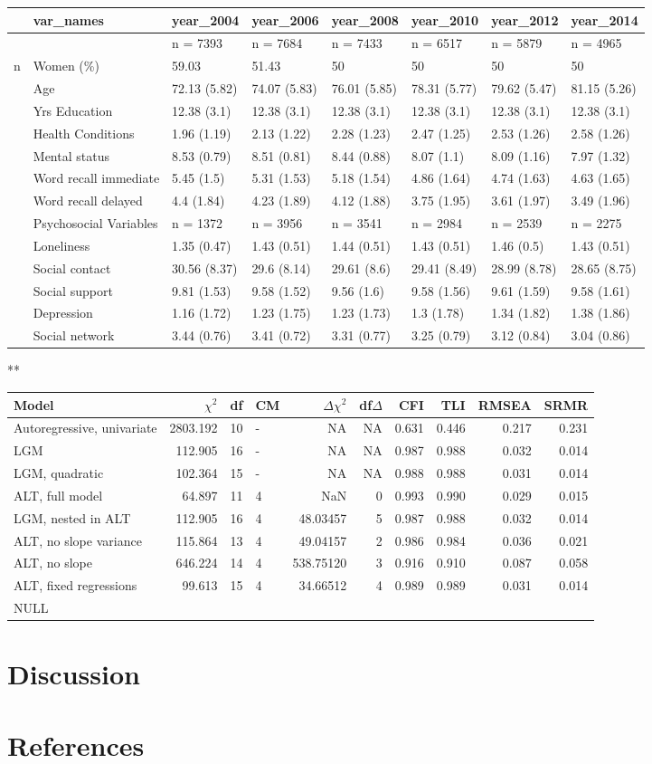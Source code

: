 \documentclass[english,man]{apa6}
\theoremstyle{definition}
\theoremstyle{definition}
\theoremstyle{remark}
\begin{document}
\begin{longtable}[]{@{}llllllll@{}}
\toprule
& var\_names & year\_2004 & year\_2006 & year\_2008 & year\_2010 &
year\_2012 & year\_2014\tabularnewline
\midrule
\endhead
& & n = 7393 & n = 7684 & n = 7433 & n = 6517 & n = 5879 & n =
4965\tabularnewline
n & Women (\%) & 59.03 & 51.43 & 50 & 50 & 50 & 50\tabularnewline
& Age & 72.13 (5.82) & 74.07 (5.83) & 76.01 (5.85) & 78.31 (5.77) &
79.62 (5.47) & 81.15 (5.26)\tabularnewline
& Yrs Education & 12.38 (3.1) & 12.38 (3.1) & 12.38 (3.1) & 12.38 (3.1)
& 12.38 (3.1) & 12.38 (3.1)\tabularnewline
& Health Conditions & 1.96 (1.19) & 2.13 (1.22) & 2.28 (1.23) & 2.47
(1.25) & 2.53 (1.26) & 2.58 (1.26)\tabularnewline
& Mental status & 8.53 (0.79) & 8.51 (0.81) & 8.44 (0.88) & 8.07 (1.1) &
8.09 (1.16) & 7.97 (1.32)\tabularnewline
& Word recall immediate & 5.45 (1.5) & 5.31 (1.53) & 5.18 (1.54) & 4.86
(1.64) & 4.74 (1.63) & 4.63 (1.65)\tabularnewline
& Word recall delayed & 4.4 (1.84) & 4.23 (1.89) & 4.12 (1.88) & 3.75
(1.95) & 3.61 (1.97) & 3.49 (1.96)\tabularnewline
& Psychosocial Variables & n = 1372 & n = 3956 & n = 3541 & n = 2984 & n
= 2539 & n = 2275\tabularnewline
& Loneliness & 1.35 (0.47) & 1.43 (0.51) & 1.44 (0.51) & 1.43 (0.51) &
1.46 (0.5) & 1.43 (0.51)\tabularnewline
& Social contact & 30.56 (8.37) & 29.6 (8.14) & 29.61 (8.6) & 29.41
(8.49) & 28.99 (8.78) & 28.65 (8.75)\tabularnewline
& Social support & 9.81 (1.53) & 9.58 (1.52) & 9.56 (1.6) & 9.58 (1.56)
& 9.61 (1.59) & 9.58 (1.61)\tabularnewline
& Depression & 1.16 (1.72) & 1.23 (1.75) & 1.23 (1.73) & 1.3 (1.78) &
1.34 (1.82) & 1.38 (1.86)\tabularnewline
& Social network & 3.44 (0.76) & 3.41 (0.72) & 3.31 (0.77) & 3.25 (0.79)
& 3.12 (0.84) & 3.04 (0.86)\tabularnewline
\bottomrule
\end{longtable}

\label{tab:immediate-word-recall-model-summaries}**

\begin{longtable}[]{@{}lrrlrrrrrr@{}}
\toprule
Model & \(\chi^2\) & df & CM & \(\Delta\chi^2\) & df\(\Delta\) & CFI &
TLI & RMSEA & SRMR\tabularnewline
\midrule
\endhead
Autoregressive, univariate & 2803.192 & 10 & - & NA & NA & 0.631 & 0.446
& 0.217 & 0.231\tabularnewline
LGM & 112.905 & 16 & - & NA & NA & 0.987 & 0.988 & 0.032 &
0.014\tabularnewline
LGM, quadratic & 102.364 & 15 & - & NA & NA & 0.988 & 0.988 & 0.031 &
0.014\tabularnewline
ALT, full model & 64.897 & 11 & 4 & NaN & 0 & 0.993 & 0.990 & 0.029 &
0.015\tabularnewline
LGM, nested in ALT & 112.905 & 16 & 4 & 48.03457 & 5 & 0.987 & 0.988 &
0.032 & 0.014\tabularnewline
ALT, no slope variance & 115.864 & 13 & 4 & 49.04157 & 2 & 0.986 & 0.984
& 0.036 & 0.021\tabularnewline
ALT, no slope & 646.224 & 14 & 4 & 538.75120 & 3 & 0.916 & 0.910 & 0.087
& 0.058\tabularnewline
ALT, fixed regressions & 99.613 & 15 & 4 & 34.66512 & 4 & 0.989 & 0.989
& 0.031 & 0.014\tabularnewline
NULL & & & & & & & & &\tabularnewline
\bottomrule
\end{longtable}

\section{Discussion}\label{discussion}

\newpage

\section{References}\label{references}

\setlength{\parindent}{-0.5in} \setlength{\leftskip}{0.5in}
\end{document}
